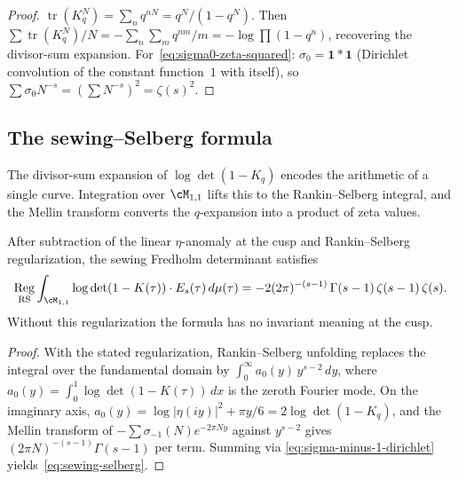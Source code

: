 \begin{proof}
$\operatorname{tr}(K_q^N) = \sum_n q^{nN} = q^N/(1-q^N)$.
Then $\sum\operatorname{tr}(K_q^N)/N
= -\sum_n\sum_m q^{nm}/m = -\log\prod(1-q^n)$, recovering the
divisor-sum expansion. For~\eqref{eq:sigma0-zeta-squared}:
$\sigma_0 = \mathbf{1}\ast\mathbf{1}$ (Dirichlet convolution of
the constant function~$1$ with itself), so
$\sum\sigma_0 N^{-s} = (\sum N^{-s})^2 = \zeta(s)^2$.
\end{proof}

\subsection{The sewing--Selberg formula}

The divisor-sum expansion of $\log\det(1-K_q)$ encodes
the arithmetic of a single curve. Integration over
$\cM_{1,1}$ lifts this to the Rankin--Selberg integral,
and the Mellin transform converts the $q$-expansion
into a product of zeta values.

\begin{theorem}
\label{thm:sewing-selberg-formula}
\ClaimStatusProvedHere
After subtraction of the linear $\eta$-anomaly at the cusp and
Rankin--Selberg regularization, the sewing Fredholm determinant
satisfies
\begin{equation}\label{eq:sewing-selberg}
 \operatorname*{Reg}_{\mathrm{RS}}\int_{\cM_{1,1}}
 \log\det(1-K(\tau))\cdot E_s(\tau)\,d\mu(\tau)
 = -2(2\pi)^{-(s-1)}\,\Gamma(s-1)\,\zeta(s-1)\,\zeta(s).
\end{equation}
Without this regularization the formula has no invariant meaning at
the cusp.
\end{theorem}

\begin{proof}
With the stated regularization, Rankin--Selberg unfolding replaces
the integral over the fundamental domain by
$\int_0^\infty a_0(y)\,y^{s-2}\,dy$, where
$a_0(y) = \int_0^1 \log\det(1-K(\tau))\,dx$ is the zeroth Fourier
mode. On the imaginary axis,
$a_0(y) = \log\lvert\eta(iy)\rvert^2+\pi y/6
= 2\log\det(1-K_q)$, and the Mellin transform of
$-\sum\sigma_{-1}(N)e^{-2\pi Ny}$ against $y^{s-2}$ gives
$(2\pi N)^{-(s-1)}\Gamma(s-1)$ per term. Summing via
\eqref{eq:sigma-minus-1-dirichlet} yields~\eqref{eq:sewing-selberg}.
\end{proof}

